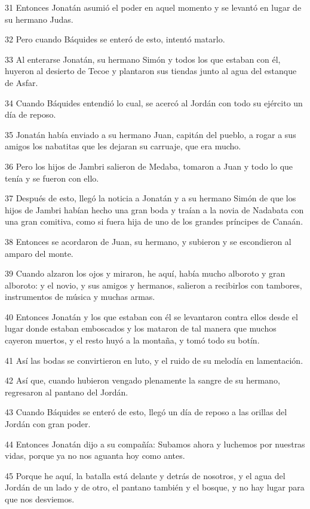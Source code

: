 \par 31 Entonces Jonatán asumió el poder en aquel momento y se levantó en lugar de su hermano Judas.
\par 32 Pero cuando Báquides se enteró de esto, intentó matarlo.
\par 33 Al enterarse Jonatán, su hermano Simón y todos los que estaban con él, huyeron al desierto de Tecoe y plantaron sus tiendas junto al agua del estanque de Asfar.
\par 34 Cuando Báquides entendió lo cual, se acercó al Jordán con todo su ejército un día de reposo.
\par 35 Jonatán había enviado a su hermano Juan, capitán del pueblo, a rogar a sus amigos los nabatitas que les dejaran su carruaje, que era mucho.
\par 36 Pero los hijos de Jambri salieron de Medaba, tomaron a Juan y todo lo que tenía y se fueron con ello.
\par 37 Después de esto, llegó la noticia a Jonatán y a su hermano Simón de que los hijos de Jambri habían hecho una gran boda y traían a la novia de Nadabata con una gran comitiva, como si fuera hija de uno de los grandes príncipes de Canaán.
\par 38 Entonces se acordaron de Juan, su hermano, y subieron y se escondieron al amparo del monte.
\par 39 Cuando alzaron los ojos y miraron, he aquí, había mucho alboroto y gran alboroto: y el novio, y sus amigos y hermanos, salieron a recibirlos con tambores, instrumentos de música y muchas armas.
\par 40 Entonces Jonatán y los que estaban con él se levantaron contra ellos desde el lugar donde estaban emboscados y los mataron de tal manera que muchos cayeron muertos, y el resto huyó a la montaña, y tomó todo su botín.
\par 41 Así las bodas se convirtieron en luto, y el ruido de su melodía en lamentación.
\par 42 Así que, cuando hubieron vengado plenamente la sangre de su hermano, regresaron al pantano del Jordán.
\par 43 Cuando Báquides se enteró de esto, llegó un día de reposo a las orillas del Jordán con gran poder.
\par 44 Entonces Jonatán dijo a su compañía: Subamos ahora y luchemos por nuestras vidas, porque ya no nos aguanta hoy como antes.
\par 45 Porque he aquí, la batalla está delante y detrás de nosotros, y el agua del Jordán de un lado y de otro, el pantano también y el bosque, y no hay lugar para que nos desviemos.

